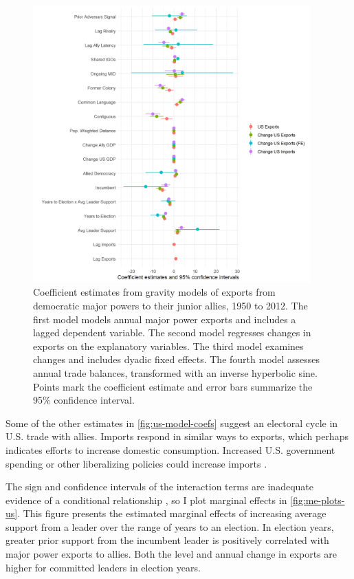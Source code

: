 \documentclass[12pt]{article}
\begin{document}
\begin{figure}[htpb]
	\centering
		\includegraphics[width=0.95\textwidth]{../figures/us-model-coefs.png}
	\caption{Coefficient estimates from gravity models of exports from democratic major powers to their junior allies, 1950 to 2012. The first model models annual major power exports and includes a lagged dependent variable. The second model regresses changes in exports on the explanatory variables. The third model examines changes and includes dyadic fixed effects. The fourth model assesses annual trade balances, transformed with an inverse hyperbolic sine. Points mark the coefficient estimate and error bars summarize the 95\% confidence interval.}
	\label{fig:us-model-coefs}
\end{figure}


Some of the other estimates in \autoref{fig:us-model-coefs} suggest an electoral cycle in U.S. trade with allies.
Imports respond in similar ways to exports, which perhaps indicates efforts to increase domestic consumption.
Increased U.S. government spending or other liberalizing policies could increase imports \citep{Oatley2015}.


The sign and confidence intervals of the interaction terms are inadequate evidence of a conditional relationship \citep{BramborClarkGolder2006}, so I plot marginal effects in \autoref{fig:me-plots-us}.
This figure presents the estimated marginal effects of increasing average support from a leader over the range of years to an election.
In election years, greater prior support from the incumbent leader is positively correlated with major power exports to allies. 
Both the level and annual change in exports are higher for committed leaders in election years.
\end{document}
